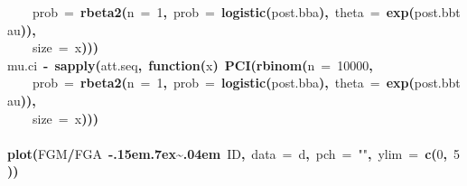 \documentclass{article}
\makeatletter
\newcommand{\hlnumber}[1]{\textcolor[rgb]{0,0,0}{#1}}%
\newcommand{\hlfunctioncall}[1]{\textcolor[rgb]{.5,0,.33}{\textbf{#1}}}%
\newcommand{\hlstring}[1]{\textcolor[rgb]{.6,.6,1}{#1}}%
\newcommand{\hlkeyword}[1]{\textbf{#1}}%
\newcommand{\hlargument}[1]{\textcolor[rgb]{.69,.25,.02}{#1}}%
\newcommand{\hlformalargs}[1]{\hlargument{#1}}%
\newcommand{\hlassignement}[1]{\textbf{#1}}%
\newcommand{\hlsymbol}[1]{#1}%
\def\urltilda{\kern -.15em\lower .7ex\hbox{\~{}}\kern .04em}%
\newcommand{\hlstd}[1]{\textcolor[rgb]{0,0,0}{#1}}%
\newenvironment{kframe}{%
 \def\FrameCommand##1{\hskip\@totalleftmargin \hskip-\fboxsep
 \colorbox{shadecolor}{##1}\hskip-\fboxsep
     \hskip-\linewidth \hskip-\@totalleftmargin \hskip\columnwidth}%
 \MakeFramed {\advance\hsize-\width
   \@totalleftmargin\z@ \linewidth\hsize
   \@setminipage}}%
 {\par\unskip\endMakeFramed}
\newenvironment{knitrout}{}{} %
\makeatother
\begin{document}
\begin{knitrout}
{\begin{kframe}
\begin{flushleft}
\hlstd{}{\ }{\ }{\ }{\ }\hlargument{prob}{\ }\hlargument{=}{\ }\hlfunctioncall{rbeta2}\hlkeyword{(}\hlargument{n}{\ }\hlargument{=}{\ }\hlnumber{1}\hlkeyword{,}{\ }\hlargument{prob}{\ }\hlargument{=}{\ }\hlfunctioncall{logistic}\hlkeyword{(}\hlsymbol{post.bb}\hlkeyword{\usebox{\hlnormalsizeboxdollar}}\hlsymbol{a}\hlkeyword{)}\hlkeyword{,}{\ }\hlargument{theta}{\ }\hlargument{=}{\ }\hlfunctioncall{exp}\hlkeyword{(}\hlsymbol{post.bb}\hlkeyword{\usebox{\hlnormalsizeboxdollar}}\hlsymbol{tau}\hlkeyword{)}\hlkeyword{)}\hlkeyword{,}\hspace*{\fill}\\
\hlstd{}{\ }{\ }{\ }{\ }\hlargument{size}{\ }\hlargument{=}{\ }\hlsymbol{x}\hlkeyword{)}\hlkeyword{)}\hlkeyword{)}\hspace*{\fill}\\
\hlstd{}\hlsymbol{mu.ci}{\ }\hlassignement{\usebox{\hlnormalsizeboxlessthan}-}{\ }\hlfunctioncall{sapply}\hlkeyword{(}\hlsymbol{att.seq}\hlkeyword{,}{\ }\hlkeyword{function}\hlkeyword{(}\hlformalargs{x}\hlkeyword{)}{\ }\hlfunctioncall{PCI}\hlkeyword{(}\hlfunctioncall{rbinom}\hlkeyword{(}\hlargument{n}{\ }\hlargument{=}{\ }\hlnumber{10000}\hlkeyword{,}\hspace*{\fill}\\
\hlstd{}{\ }{\ }{\ }{\ }\hlargument{prob}{\ }\hlargument{=}{\ }\hlfunctioncall{rbeta2}\hlkeyword{(}\hlargument{n}{\ }\hlargument{=}{\ }\hlnumber{1}\hlkeyword{,}{\ }\hlargument{prob}{\ }\hlargument{=}{\ }\hlfunctioncall{logistic}\hlkeyword{(}\hlsymbol{post.bb}\hlkeyword{\usebox{\hlnormalsizeboxdollar}}\hlsymbol{a}\hlkeyword{)}\hlkeyword{,}{\ }\hlargument{theta}{\ }\hlargument{=}{\ }\hlfunctioncall{exp}\hlkeyword{(}\hlsymbol{post.bb}\hlkeyword{\usebox{\hlnormalsizeboxdollar}}\hlsymbol{tau}\hlkeyword{)}\hlkeyword{)}\hlkeyword{,}\hspace*{\fill}\\
\hlstd{}{\ }{\ }{\ }{\ }\hlargument{size}{\ }\hlargument{=}{\ }\hlsymbol{x}\hlkeyword{)}\hlkeyword{)}\hlkeyword{)}\hspace*{\fill}\\
\hlstd{}\hspace*{\fill}\\
\hlstd{}\hlfunctioncall{plot}\hlkeyword{(}\hlsymbol{FGM}\hlkeyword{/}\hlsymbol{FGA}{\ }\hlkeyword{\urltilda{}}{\ }\hlsymbol{ID}\hlkeyword{,}{\ }\hlargument{data}{\ }\hlargument{=}{\ }\hlsymbol{d}\hlkeyword{,}{\ }\hlargument{pch}{\ }\hlargument{=}{\ }\hlstring{"{}"{}}\hlkeyword{,}{\ }\hlargument{ylim}{\ }\hlargument{=}{\ }\hlfunctioncall{c}\hlkeyword{(}\hlnumber{0}\hlkeyword{,}{\ }\hlnumber{5}\hlkeyword{)}\hlkeyword{)}\hspace*{\fill}\\

\end{flushleft}
\end{kframe}}
\end{knitrout}
\end{document}
